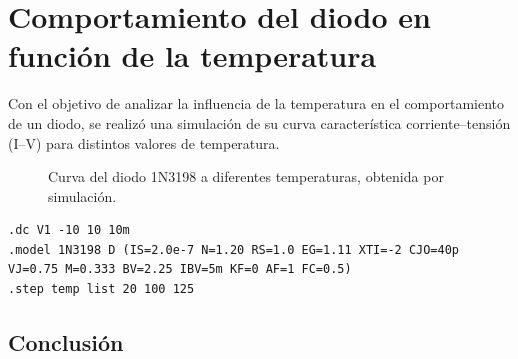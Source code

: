\chapter{Comportamiento del diodo en función de la temperatura}

Con el objetivo de analizar la influencia de la temperatura en el comportamiento de un diodo, se realizó una simulación de su curva
característica corriente–tensión (I–V) para distintos valores de temperatura. 

\begin{figure}[H]
    \centering
    \caption{Curva del diodo 1N3198 a diferentes temperaturas, obtenida por simulación.}
    \label{fig:Temperaturas}
\end{figure}

\begin{lstlisting}[style=ltspice, caption={Parámetros de simulación LTspice}]
.dc V1 -10 10 10m
.model 1N3198 D (IS=2.0e-7 N=1.20 RS=1.0 EG=1.11 XTI=-2 CJO=40p VJ=0.75 M=0.333 BV=2.25 IBV=5m KF=0 AF=1 FC=0.5)
.step temp list 20 100 125
\end{lstlisting}

\section{Conclusión}


